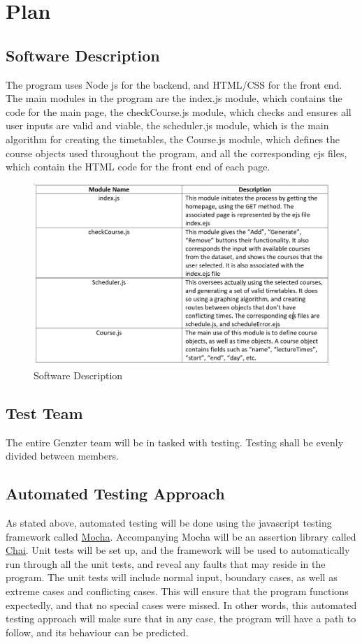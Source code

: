 \documentclass[11pt, oneside]{article}   	%
\begin{document}
\newpage



\section{Plan}
\subsection{Software Description}
The program uses Node js for the backend, and HTML/CSS for the front end. The main modules in the program are the index.js module, which contains the code for the main page, the checkCourse.js module, which checks and  ensures all user inputs are valid and viable, the scheduler.js module, which is the main algorithm for creating the timetables, the Course.js module, which defines the course objects used throughout the program, and all the corresponding ejs files, which contain the HTML code for the front end of each page. 


\begin{figure}[H]
   \centering
   \includegraphics[width=5in]{images/Software_Description.png} 
   \caption{Software Description}
   \label{s_d}
\end{figure}


\subsection{Test Team}
The entire Genzter team will be in tasked with testing. Testing shall be evenly divided between members.

\subsection{Automated Testing Approach}
As stated above, automated testing will be done using the javascript testing framework called \href{http://mochajs.org}{Mocha}. Accompanying Mocha will be an assertion library called \href{http://chaijs.com/}{Chai}. Unit tests will be set up, and the framework will be used to automatically run through all the unit tests, and reveal any faults that may reside in the program. The unit tests will include normal input, boundary cases, as well as extreme cases and conflicting cases. This will ensure that the program functions expectedly, and that no special cases were missed. In other words, this automated testing approach will make sure that in any case, the program will have a path to follow, and its behaviour can be predicted.
\end{document}
